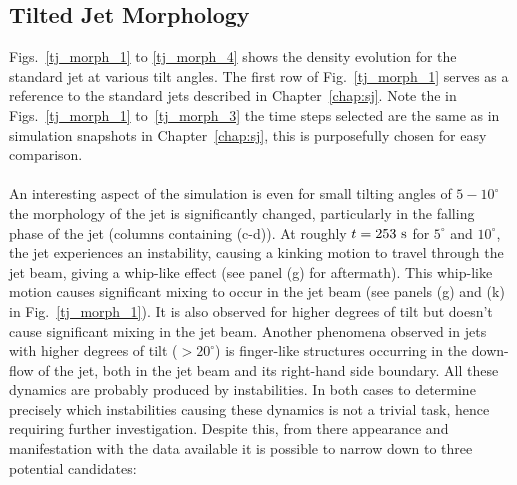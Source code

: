 \documentclass[12pt]{ociamthesis}
\newcommand{\np}{\\ \\}
\begin{document}
\subsection{Tilted Jet Morphology}
\label{subsec:steady}
Figs.~\ref{tj_morph_1} to \ref{tj_morph_4} shows the density evolution for the standard jet at various tilt angles. The first row of Fig.~\ref{tj_morph_1} serves as a reference to the standard jets described in Chapter~\ref{chap:sj}. Note the in Figs.~\ref{tj_morph_1} to~\ref{tj_morph_3} the time steps selected are the same as in simulation snapshots in Chapter~\ref{chap:sj}, this is purposefully chosen for easy comparison. \np
%
An interesting aspect of the simulation is even for small tilting angles of $5-10^{\circ}$ the morphology of the jet is significantly changed, particularly in the falling phase of the jet (columns containing (c-d)). At roughly $t=253~\rm{s}$ for $5^{\circ}$ and $10^{\circ}$, the jet experiences an instability, causing a kinking motion to travel through the jet beam, giving a whip-like effect (see panel (g) for aftermath). This whip-like motion causes significant mixing to occur in the jet beam (see panels (g) and (k) in Fig.~\ref{tj_morph_1}). It is also observed for higher degrees of tilt but doesn't cause significant mixing in the jet beam. Another phenomena observed in jets with higher degrees of tilt ($>20^{\circ}$) is finger-like structures occurring in the down-flow of the jet, both in the jet beam and its right-hand side boundary. All these dynamics are probably produced by instabilities. In both cases to determine precisely which instabilities causing these dynamics is not a trivial task, hence requiring further investigation. Despite this, from there appearance and manifestation with the data available it is possible to narrow down to three potential candidates:
\end{document}
